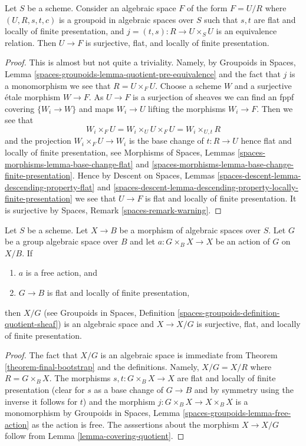 \begin{lemma}
\label{lemma-covering-quotient}
Let $S$ be a scheme. Consider an algebraic space $F$ of the form $F = U/R$
where $(U, R, s, t, c)$ is a groupoid in algebraic spaces
over $S$ such that $s, t$ are flat and locally of finite presentation, and
$j = (t, s) : R \to U \times_S U$ is an equivalence relation.
Then $U \to F$ is surjective, flat, and locally of finite presentation.
\end{lemma}

\begin{proof}
This is almost but not quite a triviality. Namely, by
Groupoids in Spaces, Lemma
\ref{spaces-groupoids-lemma-quotient-pre-equivalence}
and the fact that $j$ is a monomorphism we see that $R = U \times_F U$.
Choose a scheme $W$ and a surjective \'etale morphism $W \to F$.
As $U \to F$ is a surjection of sheaves we can find an fppf covering
$\{W_i \to W\}$ and maps $W_i \to U$ lifting the morphisms $W_i \to F$.
Then we see that
$$
W_i \times_F U = W_i \times_U U \times_F U = W_i \times_{U, t} R
$$
and the projection $W_i \times_F U \to W_i$ is the base change of
$t : R \to U$ hence flat and locally of finite presentation, see
Morphisms of Spaces, Lemmas
\ref{spaces-morphisms-lemma-base-change-flat} and
\ref{spaces-morphisms-lemma-base-change-finite-presentation}.
Hence by
Descent on Spaces, Lemmas
\ref{spaces-descent-lemma-descending-property-flat} and
\ref{spaces-descent-lemma-descending-property-locally-finite-presentation}
we see that $U \to F$ is flat and locally of finite presentation.
It is surjective by
Spaces, Remark \ref{spaces-remark-warning}.
\end{proof}

\begin{lemma}
\label{lemma-quotient-free-action}
Let $S$ be a scheme. Let $X \to B$ be a morphism of algebraic spaces over
$S$. Let $G$ be a group algebraic space over $B$ and let
$a : G \times_B X \to X$ be an action of $G$ on $X/B$.
If
\begin{enumerate}
\item $a$ is a free action, and
\item $G \to B$ is flat and locally of finite presentation,
\end{enumerate}
then $X/G$ (see
Groupoids in Spaces, Definition
\ref{spaces-groupoids-definition-quotient-sheaf})
is an algebraic space and $X \to X/G$ is surjective, flat, and locally
of finite presentation.
\end{lemma}

\begin{proof}
The fact that $X/G$ is an algebraic space is immediate from
Theorem \ref{theorem-final-bootstrap}
and the definitions. Namely, $X/G = X/R$ where $R = G \times_B X$.
The morphisms $s, t : G \times_B X \to X$ are flat and locally of
finite presentation (clear for $s$ as a base change of $G \to B$ and
by symmetry using the inverse it follows for $t$) and the morphism
$j : G \times_B X \to X \times_B X$ is a monomorphism by
Groupoids in Spaces, Lemma \ref{spaces-groupoids-lemma-free-action}
as the action is free. The asssertions about the morphism $X \to X/G$
follow from
Lemma \ref{lemma-covering-quotient}.
\end{proof}

